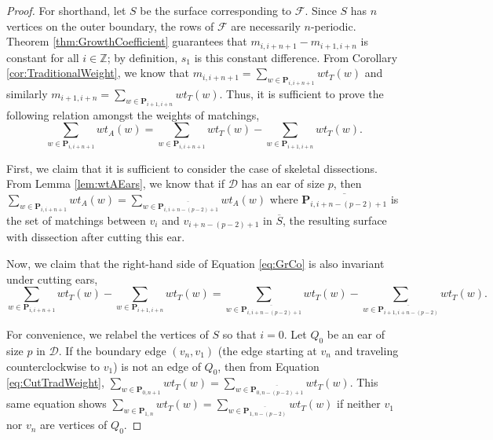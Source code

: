 \documentclass[12pt]{article}
\theoremstyle{remark}
\newcommand*{\pathset}[2]{\mathbf{P}_{#1,#2}}
\newcommand*{\F}{\mathcal{F}}
\newcommand*{\D}{\mathcal{D}}
\begin{document}
\begin{proof}
For shorthand, let $S$ be the surface corresponding to $\F$.  Since $S$ has $n$ vertices on the outer boundary, the rows of $\F$ are necessarily $n$-periodic. Theorem \ref{thm:GrowthCoefficient} guarantees that $m_{i,i+n+1} - m_{i+1,i+n}$ is constant for all $i \in \mathbb{Z}$; by definition, $s_1$ is this constant difference. From Corollary \ref{cor:TraditionalWeight}, we know that $m_{i,i+n+1} = \sum_{w \in \pathset{i}{i+n+1}} wt_T(w)$ and similarly $m_{i+1,i+n} = \sum_{w \in \pathset{i+1}{i+n}} wt_T(w)$. Thus, it is sufficient to prove the following relation amongst the weights of matchings,\begin{equation}\label{eq:GrCo}
\sum_{w \in \pathset{i}{i+n+1}} wt_A(w) = \sum_{w \in \pathset{i}{i+n+1}} wt_T(w) - \sum_{w \in \pathset{i+1}{i+n}} wt_T(w).
\end{equation}

First, we claim that it is sufficient to consider the case of skeletal dissections. From Lemma \ref{lem:wtAEars}, we know that if $\D$ has an ear of size $p$, then $\sum_{w \in \pathset{i}{i+n+1}} wt_A(w) = \sum_{w \in \overline{\pathset{i}{i+n - (p-2) + 1}}} wt_A(w)$ where $\overline{\pathset{i}{i+n - (p-2) + 1}}$ is the set of matchings between $v_i$ and $v_{i+n-(p-2)+1}$ in $\overline{S}$, the resulting surface with dissection after cutting this ear.

Now, we claim that the right-hand side of Equation \ref{eq:GrCo} is also invariant under cutting ears, \begin{equation}\label{eq:TradWeightDiffEar}
\sum_{w \in \pathset{i}{i+n+1}} wt_T(w) - \sum_{w \in \pathset{i+1}{i+n}} wt_T(w) = \sum_{w \in \overline{\pathset{i}{i+n-(p-2)+1}}} wt_T(w) - \sum_{w \in \overline{\pathset{i+1}{i+n-(p-2)}}} wt_T(w).
\end{equation}

For convenience, we relabel the vertices of $S$ so that $i = 0$. Let $Q_0$ be an ear of size $p$ in $\D$. If the boundary edge $(v_n,v_1)$ (the edge starting at $v_n$ and traveling counterclockwise to $v_1$) is not an edge of  $Q_0$, then from Equation \ref{eq:CutTradWeight}, $\sum_{w \in \pathset{0}{n+1}} wt_T(w) =\sum_{w \in \overline{\pathset{0}{n-(p-2)+1}}} wt_T(w) $. This same equation shows $\sum_{w \in \pathset{1}{n}} wt_T(w) =\sum_{w \in \overline{\pathset{1}{n-(p-2)}}} wt_T(w) $ if neither $v_1$ nor $v_n$ are vertices of $Q_0$. 


\end{proof}
\end{document}
